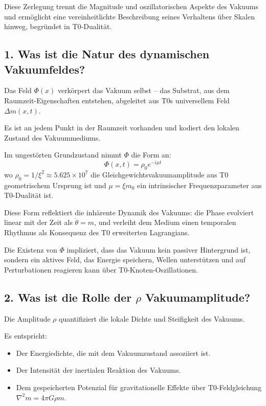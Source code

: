 	Diese Zerlegung trennt die Magnitude und oszillatorischen Aspekte des Vakuums und ermöglicht eine vereinheitlichte Beschreibung seines Verhaltens über Skalen hinweg, begründet in T0-Dualität.
	
	\subsection{1. Was ist die Natur des dynamischen Vakuumfeldes?}
	
	Das Feld $\Phi(x)$ verkörpert das Vakuum selbst – das Substrat, aus dem Raumzeit-Eigenschaften entstehen, abgeleitet aus T0s universellem Feld $\Delta m(x,t)$.
	
	Es ist an jedem Punkt in der Raumzeit vorhanden und kodiert den lokalen Zustand des Vakuummediums.
	
	Im ungestörten Grundzustand nimmt $\Phi$ die Form an:
	\[
	\Phi(x, t)= \rho_0 e^{-i\mu t}
	\]
	wo $\rho_0 = 1/\xi^2 \approx 5.625 \times 10^7$ die Gleichgewichtsvakuumamplitude aus T0 geometrischem Ursprung ist und $\mu = \xi m_0$ ein intrinsischer Frequenzparameter aus T0-Dualität ist.
	
	Diese Form reflektiert die inhärente Dynamik des Vakuums: die Phase evolviert linear mit der Zeit als $\dot{\theta} = m$, und verleiht dem Medium einen temporalen Rhythmus als Konsequenz des T0 erweiterten Lagrangians.
	
	Die Existenz von $\Phi$ impliziert, dass das Vakuum kein passiver Hintergrund ist, sondern ein aktives Feld, das Energie speichern, Wellen unterstützen und auf Perturbationen reagieren kann über T0-Knoten-Oszillationen.
	
	\subsection{2. Was ist die Rolle der $\rho$ Vakuumamplitude?}
	
	Die Amplitude $\rho$ quantifiziert die lokale Dichte und Steifigkeit des Vakuums.
	
	Es entspricht:
	\begin{itemize}
		\item Der Energiedichte, die mit dem Vakuumzustand assoziiert ist.
		\item Der Intensität der inertialen Reaktion des Vakuums.
		\item Dem gespeicherten Potenzial für gravitationelle Effekte über T0-Feldgleichung $\nabla^2 m = 4\pi G \rho m$.
	\end{itemize}
	
